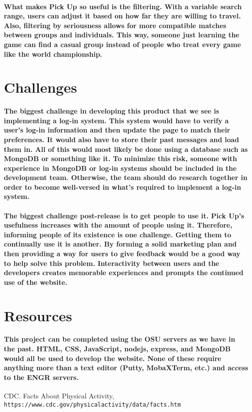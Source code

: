 \documentclass[12pt]{article}
\begin{document}
            \paragraph{What makes Pick Up so useful is the filtering. With a variable search range, users can adjust it based on how far they are willing to travel. Also, filtering by seriousness allows for more compatible matches between groups and individuals. This way, someone just learning the game can find a casual group instead of people who treat every game like the world championship.}
        \section{Challenges}
            \paragraph{The biggest challenge in developing this product that we see is implementing a log-in system. This system would have to verify a user's log-in information and then update the page to match their preferences. It would also have to store their past messages and load them in. All of this would most likely be done using a database such as MongoDB or something like it. To minimize this risk, someone with experience in MongoDB or log-in systems should be included in the development team. Otherwise, the team should do research together in order to become well-versed in what's required to implement a log-in system.}
            \paragraph{The biggest challenge post-release is to get people to use it. Pick Up's usefulness increases with the amount of people using it. Therefore, informing people of its existence is one challenge. Getting them to continually use it is another. By forming a solid marketing plan and then providing a way for users to give feedback would be a good way to help solve this problem. Interactivity between users and the developers creates memorable experiences and prompts the continued use of the website.}
        \section{Resources}
        		\paragraph{This project can be completed using the OSU servers as we have in the past. HTML, CSS, JavaScript, nodejs, express, and MongoDB would all be used to develop the website. None of these require anything more than a text editor (Putty, MobaXTerm, etc.) and access to the ENGR servers.}
        
\begin{thebibliography}{9}
CDC. Facts About Physical Activity, 
\\\texttt{https://www.cdc.gov/physicalactivity/data/facts.htm}
\end{thebibliography}
\end{document}
